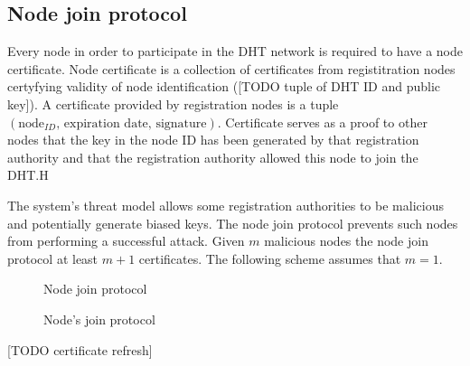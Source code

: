\subsection{Node join protocol}

Every node in order to participate in the DHT network is required to have a node
certificate. Node certificate is a collection of certificates from registitration
nodes certyfying validity of node identification ([TODO tuple of DHT ID and
public key]). A certificate provided by registration nodes is a tuple
$\left(\text{node}_{ID}, \, \text{expiration date}, \, \text{signature}\right)$.
Certificate serves as a proof to other nodes that the key in the node ID has been
generated by that registration authority and that the registration authority
allowed this node to join the DHT.H

The system's threat model allows some registration authorities to be malicious
and potentially generate biased keys. The node join protocol prevents such nodes
from performing a successful attack. Given $m$ malicious nodes the node join
protocol at least $m+1$ certificates. The following scheme assumes that $m = 1$.

\begin{figure}
\begin{msc}{Node join protocol}
\setlength{\instdist}{5.5cm}
\setlength{\envinstdist}{3cm}
\nextlevel[2]
\nextlevel
{}
\nextlevel[4]
\nextlevel[2]
\nextlevel[2]
\nextlevel[2]
\nextlevel[2]
\nextlevel[2]
\nextlevel[2]
\nextlevel[2]
\nextlevel[1]
\end{msc}
\caption{Node's join protocol}
\end{figure}

[TODO certificate refresh]

